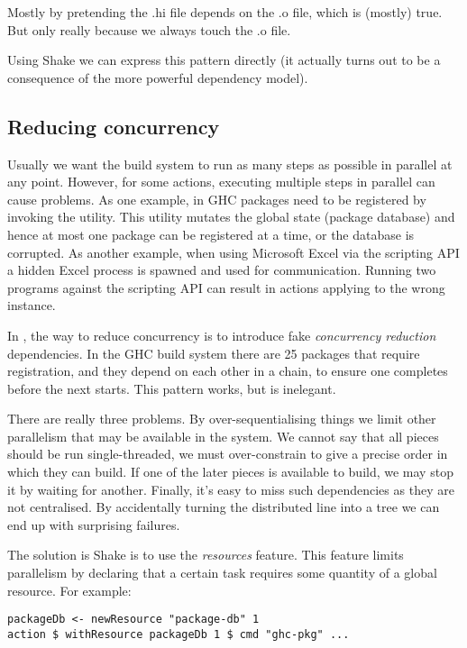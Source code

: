 Mostly by pretending the .hi file depends on the .o file, which is (mostly) true. But only really because we always touch the .o file.

Using Shake we can express this pattern directly (it actually turns out to be a consequence of the more powerful dependency model).

\subsection{Reducing concurrency}

Usually we want the build system to run as many steps as possible in parallel at
any point. However, for some actions, executing multiple steps in parallel can
cause problems. As one example, in GHC packages need to be registered by
invoking the  utility. This utility mutates the global state
(package database) and hence at most one package can be registered at a time, or
the database is corrupted. As another example, when using Microsoft Excel via
the scripting API a hidden Excel process is spawned and used for communication.
Running two programs against the scripting API can result in actions applying to
the wrong instance.

In \make{}, the way to reduce concurrency is to introduce fake \emph{concurrency
reduction} dependencies. In the GHC build system there are 25 packages that
require registration, and they depend on each other in a chain, to ensure one
completes before the next starts. This pattern works, but is inelegant.

There are really three problems. By over-sequentialising things we limit other
parallelism that may be available in the system. We cannot say that all pieces
should be run single-threaded, we must over-constrain to give a precise order in
which they can build. If one of the later pieces is available to build, we may
stop it by waiting for another. Finally, it's easy to miss such dependencies as
they are not centralised. By accidentally turning the distributed line into a
tree we can end up with surprising failures.

The solution is Shake is to use the \emph{resources} feature. This feature limits parallelism by declaring that a certain task requires some quantity of a global resource. For example:

\begin{lstlisting}[basicstyle=\ttfamily]
packageDb <- newResource "package-db" 1
action $ withResource packageDb 1 $ cmd "ghc-pkg" ...
\end{lstlisting}

